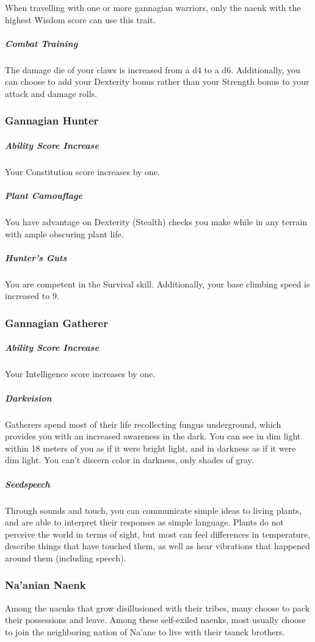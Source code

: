     When travelling with one or more gannagian warriors, only the naenk with the highest Wisdom score can use this trait.

    \subparagraph{Combat Training} The damage die of your claws is increased from a d4 to a d6.
    Additionally, you can choose to add your Dexterity bonus rather than your Strength bonus to your attack and damage rolls.

\subsubsection{Gannagian Hunter}
    \subparagraph{Ability Score Increase} Your Constitution score increases by one.

    \subparagraph{Plant Camouflage} You have advantage on Dexterity (Stealth) checks you make while in any terrain with ample obscuring plant life.

    \subparagraph{Hunter's Guts} You are competent in the Survival skill.
    Additionally, your base climbing speed is increased to 9.

\subsubsection{Gannagian Gatherer}
    \subparagraph{Ability Score Increase} Your Intelligence score increases by one.

    \subparagraph{Darkvision} Gatherers spend most of their life recollecting fungus underground, which provides you with an increased awareness in the dark.
    You can see in dim light within 18 meters of you as if it were bright light, and in darkness as if it were dim light.
    You can't discern color in darkness, only shades of gray.

    \subparagraph{Seedspeech} Through sounds and touch, you can communicate simple ideas to living plants, and are able to interpret their responses as simple language.
    Plants do not perceive the world in terms of sight, but most can feel differences in temperature, describe things that have touched them, as well as hear vibrations that happened around them (including speech).

\subsubsection{Na'anian Naenk}
    Among the naenks that grow disillusioned with their tribes, many choose to pack their possessions and leave.
    Among these self-exiled naenks, most usually choose to join the neighboring nation of Na'ane to live with their tsanek brothers.

